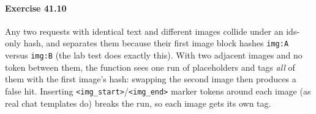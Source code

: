 \paragraph{Exercise 41.10} Any two requests with identical text and different images collide under an
ids-only hash, and  separates them because their first image block hashes
\texttt{img:A} versus \texttt{img:B} (the lab test does exactly this). With two adjacent images and no
token between them, the function sees one run of placeholders and tags \emph{all} of them with the first
image's hash: swapping the second image then produces a false hit. Inserting
\texttt{<img\_start>}/\texttt{<img\_end>} marker tokens around each image (as real chat templates do) breaks the
run, so each image gets its own tag.
\par\endgroup
